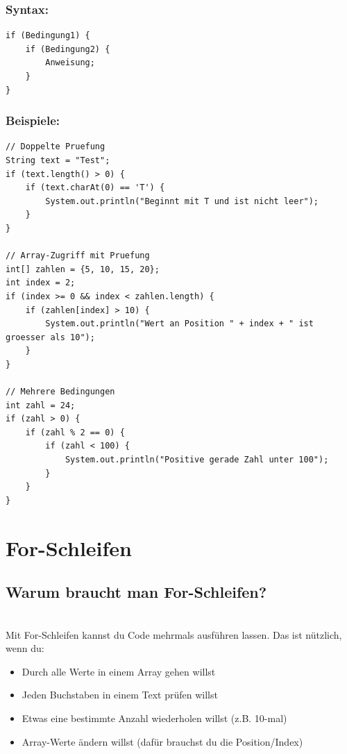 \subsubsection*{Syntax:}
\begin{lstlisting}
if (Bedingung1) {
    if (Bedingung2) {
        Anweisung;
    }
}
\end{lstlisting}

\subsubsection*{Beispiele:}
\begin{lstlisting}
// Doppelte Pruefung
String text = "Test";
if (text.length() > 0) {
    if (text.charAt(0) == 'T') {
        System.out.println("Beginnt mit T und ist nicht leer");
    }
}

// Array-Zugriff mit Pruefung
int[] zahlen = {5, 10, 15, 20};
int index = 2;
if (index >= 0 && index < zahlen.length) {
    if (zahlen[index] > 10) {
        System.out.println("Wert an Position " + index + " ist groesser als 10");
    }
}

// Mehrere Bedingungen
int zahl = 24;
if (zahl > 0) {
    if (zahl % 2 == 0) {
        if (zahl < 100) {
            System.out.println("Positive gerade Zahl unter 100");
        }
    }
}
\end{lstlisting}

\newpage


\section*{For-Schleifen}

\subsection*{Warum braucht man For-Schleifen?}\\
Mit For-Schleifen kannst du Code mehrmals ausführen lassen. Das ist nützlich, wenn du:
\begin{itemize}
	\item Durch alle Werte in einem Array gehen willst
	\item Jeden Buchstaben in einem Text prüfen willst
	\item Etwas eine bestimmte Anzahl wiederholen willst (z.B. 10-mal)
	\item Array-Werte ändern willst (dafür brauchst du die Position/Index)
\end{itemize}

